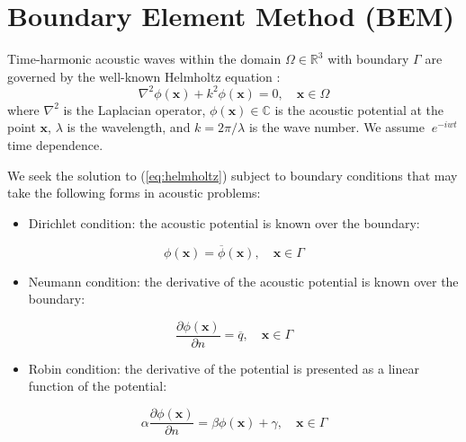 \documentclass[review]{elsarticle}
\begin{document}
\section{ Boundary Element Method (BEM)}

Time-harmonic acoustic waves within the domain $\Omega \in \mathbb{R}^3$ with boundary $\Gamma$ are governed by the well-known Helmholtz equation \cite{Morse}: 
\begin{equation}
\nabla^2\phi(\mathbf{x})+k^2\phi(\mathbf{x})=0, \quad\mathbf{x}\in\Omega
\label{eq:helmholtz}
\end{equation}
where $\nabla^2$ is the Laplacian operator, $\phi(\mathbf{x}) \in \mathbb{C}$ is the acoustic potential at the point $\mathbf x$, $\lambda$ is the wavelength, and $k=2\pi/\lambda$ is the wave number. We assume $ \ e^{-iwt}$ time dependence.

We seek the solution to (\ref{eq:helmholtz}) subject to boundary conditions that may take the following forms in acoustic problems:
\begin{itemize}
	\item Dirichlet condition: the acoustic potential is known over the boundary:
\end{itemize}
\begin{equation} 
\phi(\mathbf{x})=\overline{\phi}(\mathbf{x}), \quad \mathbf{x}\in \Gamma
\label{eq:eq25}
\end{equation}
\begin{itemize}
	\item Neumann condition: the derivative of the acoustic potential is known over the boundary:
\end{itemize}
\begin{equation}
\frac{\partial\phi(\mathbf{x})}{\partial{n}}=\overline{q}, \quad \mathbf{x}\in \Gamma
\label{eq:eq26}
\end{equation}
\begin{itemize}
	\item Robin condition: the derivative of the potential is presented as a linear function of the potential:
\end{itemize}
\begin{equation}
\alpha\frac{\partial\phi(\mathbf{x})}{\partial{n}}= \beta\phi(\mathbf{x})+\gamma, \quad \mathbf{x}\in \Gamma  
\label{eq:eq27}
\end{equation}
\end{document}
